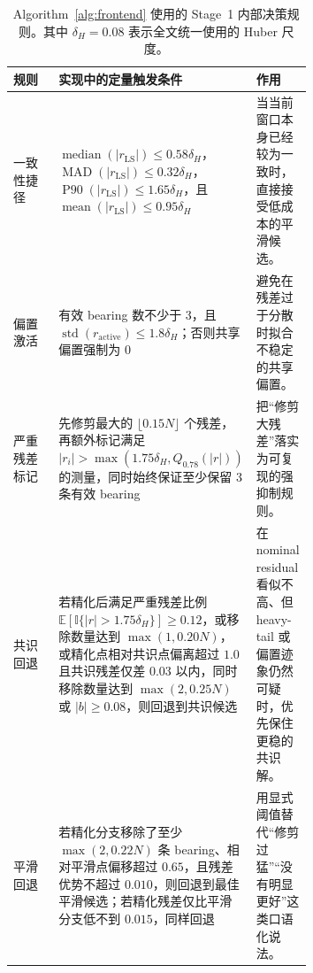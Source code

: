 \begin{table}[!htbp]
\centering
\caption{Algorithm~\ref{alg:frontend} 使用的 Stage~1 内部决策规则。其中 $\delta_H=0.08$ 表示全文统一使用的 Huber 尺度。}
\label{tab:stagerules}
\small
\begin{tabularx}{\linewidth}{>{\RaggedRight\arraybackslash}p{0.19\linewidth} >{\RaggedRight\arraybackslash}p{0.48\linewidth} >{\RaggedRight\arraybackslash}X}
\toprule
规则 & 实现中的定量触发条件 & 作用 \\
\midrule
一致性捷径 & $\operatorname{median}(|r_{\mathrm{LS}}|)\le 0.58\delta_H$，$\operatorname{MAD}(|r_{\mathrm{LS}}|)\le 0.32\delta_H$，$\operatorname{P90}(|r_{\mathrm{LS}}|)\le 1.65\delta_H$，且 $\operatorname{mean}(|r_{\mathrm{LS}}|)\le 0.95\delta_H$ & 当当前窗口本身已经较为一致时，直接接受低成本的平滑候选。 \\
偏置激活 & 有效 bearing 数不少于 3，且 $\operatorname{std}(r_{\mathrm{active}})\le 1.8\delta_H$；否则共享偏置强制为 0 & 避免在残差过于分散时拟合不稳定的共享偏置。 \\
严重残差标记 & 先修剪最大的 $\lfloor 0.15N\rfloor$ 个残差，再额外标记满足 $|r_i|>\max(1.75\delta_H,Q_{0.78}(|r|))$ 的测量，同时始终保证至少保留 3 条有效 bearing & 把“修剪大残差”落实为可复现的强抑制规则。 \\
共识回退 & 若精化后满足严重残差比例 $\mathbb{E}[\mathbb{I}\{|r|>1.75\delta_H\}]\ge 0.12$，或移除数量达到 $\max(1,0.20N)$，或精化点相对共识点偏离超过 $1.0$ 且共识残差仅差 $0.03$ 以内，同时移除数量达到 $\max(2,0.25N)$ 或 $|b|\ge 0.08$，则回退到共识候选 & 在 nominal residual 看似不高、但 heavy-tail 或偏置迹象仍然可疑时，优先保住更稳的共识解。 \\
平滑回退 & 若精化分支移除了至少 $\max(2,0.22N)$ 条 bearing、相对平滑点偏移超过 $0.65$，且残差优势不超过 $0.010$，则回退到最佳平滑候选；若精化残差仅比平滑分支低不到 $0.015$，同样回退 & 用显式阈值替代“修剪过猛”“没有明显更好”这类口语化说法。 \\
\bottomrule
\end{tabularx}
\end{table}
